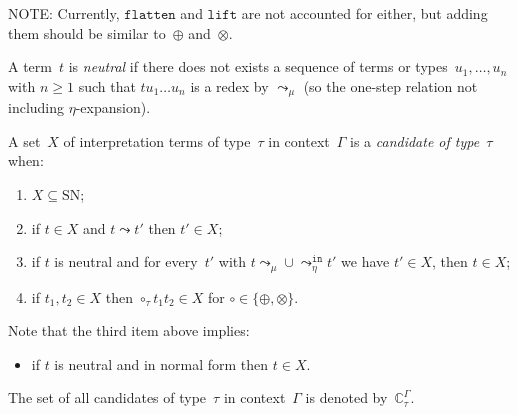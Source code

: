 \documentclass[runningheads,a4paper]{llncs}
\newcommand{\arretain}{\leadsto_\eta^{\mathtt{in}}}
\newcommand{\arrnormalise}{\leadsto}
\newcommand{\normstep}{\leadsto_\mu}
\newcommand{\flatten}{\mathtt{flatten}}
\newcommand{\lift}{\mathtt{lift}}
\newcommand{\SN}{\mathrm{SN}}
\newcommand{\Cb}{\mathbb{C}}
\begin{document}
NOTE: Currently, $\flatten$ and $\lift$ are not accounted for either,
but adding them should be similar to~$\oplus$ and~$\otimes$.

\begin{definition}\label{def_candidate}
  A term~$t$ is \emph{neutral} if there does not exists a sequence of
  terms or types~$u_1,\ldots,u_n$ with $n \ge 1$ such that $t u_1 \ldots
  u_n$ is a redex by $\normstep$ (so the one-step relation not including
  $\eta$-expansion).

  A set~$X$ of interpretation terms of type~$\tau$ in context~$\Gamma$
  is a \emph{candidate of type~$\tau$} when:
  \begin{enumerate}
  \item $X \subseteq \SN$;
  \item if $t \in X$ and $t \arrnormalise t'$ then $t' \in X$;
  \item if $t$ is neutral and for every~$t'$ with $t \normstep \cup
    \arretain t'$ we have $t' \in X$, then $t \in X$;
  \item if $t_1,t_2 \in X$ then $\circ_\tau t_1 t_2 \in X$ for $\circ
    \in \{\oplus,\otimes\}$.
  \end{enumerate}
  Note that the third item above implies:
  \begin{itemize}
  \item if $t$ is neutral and in normal form then $t \in X$.
  \end{itemize}
  The set of all candidates of type~$\tau$ in context~$\Gamma$ is
  denoted by~$\Cb_\tau^\Gamma$.
\end{definition}
\end{document}
